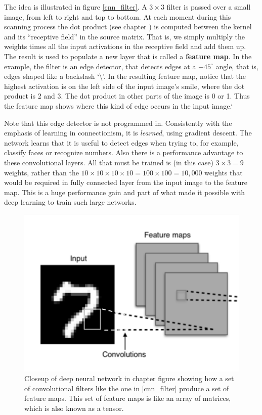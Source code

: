 The idea is illustrated in figure \ref{cnn_filter}. A $3 \times 3$ filter is passed over a small image, from left to right and top to bottom. At each moment during this scanning process the dot product (see chapter ) is computed between the kernel and its ``receptive field'' in the source matrix. That is, we simply multiply the weights times all the input activations in  the receptive field and  add them up. The result is used to populate a new layer that is called a \textbf{feature map}. In the example, the filter is an edge detector, that detects edges at a $-45^\circ$ angle, that is, edges shaped like a backslash `\textbackslash'. In the resulting feature map, notice that the highest activation is on the left side of the input image's smile, where the dot product is 2 and 3. The dot product in other parts of the image is 0 or 1. Thus the feature map shows where this kind of edge occurs in the input image.`

Note that this edge detector is not programmed in. Consistently with the emphasis of learning in connectionism, it is \emph{learned}, using gradient descent. The network learns that it is useful to  detect edges when trying to, for example, classify faces or recognize numbers. Also there is a performance advantage to these convolutional layers. All that must be trained is (in this case) $3 \times 3=9$ weights, rather than the $10 \times 10 \times 10 \times 10 = 100 \times 100 = 10,000$ weights that would be required in fully connected layer from the input image to the feature map. This is a huge performance gain and part of what  made it possible with deep learning to train such large networks.

\begin{figure}[h]
\centering
\includegraphics[scale=.4]{./images/deepNetCloseup.png}
\caption[Closeup from a creative commons image by Aphex34 at \url{https://commons.wikimedia.org/wiki/File:Typical_cnn.png} ]{Closeup of deep neural network in chapter  figure  showing how a set of convolutional filters like the one in \ref{cnn_filter} produce a set of feature maps. This set of feature maps is like an array of matrices, which is also known as a tensor.}
\label{deep_net_closeup}
\end{figure}

